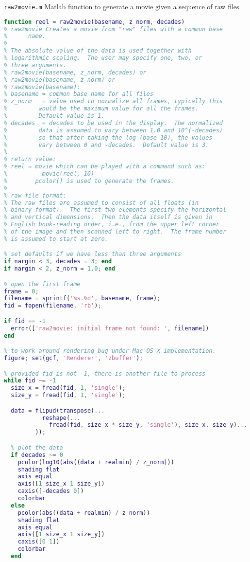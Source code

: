 \begin{program}
{\tt raw2movie.m} Matlab function to generate a movie given a sequence
of raw files.
\label{pro:raw2movie}
\codemiddle
\begin{lstlisting}[language=Matlab]
function reel = raw2movie(basename, z_norm, decades)
% raw2movie Creates a movie from "raw" files with a common base
%      name.
%
% The absolute value of the data is used together with
% logarithmic scaling.  The user may specify one, two, or
% three arguments.
% raw2movie(basename, z_norm, decades) or
% raw2movie(basename, z_norm) or
% raw2movie(basename):
% basename = common base name for all files
% z_norm   = value used to normalize all frames, typically this
%         would be the maximum value for all the frames.
%         Default value is 1.
% decades  = decades to be used in the display.  The normalized
%         data is assumed to vary between 1.0 and 10^(-decades)
%         so that after taking the log (base 10), the values
%         vary between 0 and -decades.  Default value is 3.
%
% return value:
% reel = movie which can be played with a command such as:
%          movie(reel, 10)
%        pcolor() is used to generate the frames.
%
% raw file format:
% The raw files are assumed to consist of all floats (in
% binary format).  The first two elements specify the horizontal
% and vertical dimensions.  Then the data itself is given in
% English book-reading order, i.e., from the upper left corner
% of the image and then scanned left to right.  The frame number
% is assumed to start at zero.

% set defaults if we have less than three arguments
if nargin < 3, decades = 3; end
if nargin < 2, z_norm = 1.0; end

% open the first frame
frame = 0;
filename = sprintf('%s.%d', basename, frame);
fid = fopen(filename, 'rb');

if fid == -1
  error(['raw2movie: initial frame not found: ', filename])
end

% to work around rendering bug under Mac OS X implementation.
figure; set(gcf, 'Renderer', 'zbuffer');

% provided fid is not -1, there is another file to process
while fid ~= -1
  size_x = fread(fid, 1, 'single');
  size_y = fread(fid, 1, 'single');

  data = flipud(transpose(...
           reshape(...
             fread(fid, size_x * size_y, 'single'), size_x, size_y)...
         ));

  % plot the data
  if decades ~= 0
    pcolor(log10(abs((data + realmin) / z_norm)))
    shading flat
    axis equal
    axis([1 size_x 1 size_y])
    caxis([-decades 0])
    colorbar
  else
    pcolor(abs((data + realmin) / z_norm))
    shading flat
    axis equal
    axis([1 size_x 1 size_y])
    caxis([0 1])
    colorbar
  end


\end{lstlisting}
\end{program}
